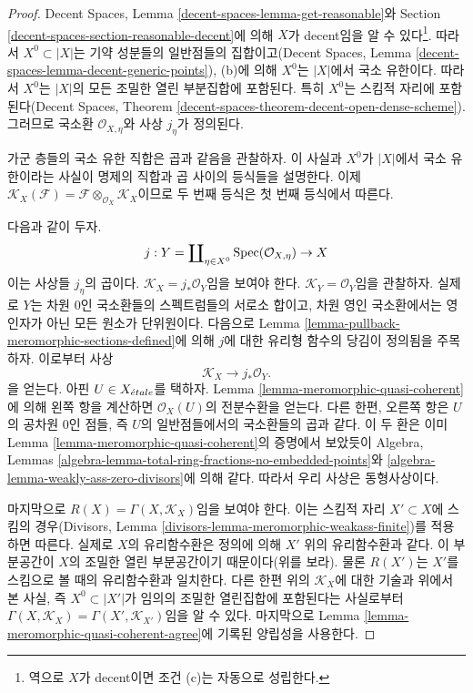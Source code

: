 \begin{proof}
Decent Spaces, Lemma \ref{decent-spaces-lemma-get-reasonable}와 Section
\ref{decent-spaces-section-reasonable-decent}에 의해 $X$가 decent임을 알 수
있다\footnote{역으로 $X$가 decent이면 조건 (c)는 자동으로 성립한다.}.
따라서 $X^0 \subset |X|$는 기약 성분들의 일반점들의 집합이고(Decent
Spaces, Lemma \ref{decent-spaces-lemma-decent-generic-points}), (b)에 의해
$X^0$는 $|X|$에서 국소 유한이다. 따라서 $X^0$는 $|X|$의 모든 조밀한 열린
부분집합에 포함된다. 특히 $X^0$는 스킴적 자리에 포함된다(Decent Spaces,
Theorem \ref{decent-spaces-theorem-decent-open-dense-scheme}). 그러므로
국소환 $\mathcal{O}_{X, \eta}$와 사상 $j_\eta$가 정의된다.

\medskip\noindent
가군 층들의 국소 유한 직합은 곱과 같음을 관찰하자. 이 사실과 $X^0$가
$|X|$에서 국소 유한이라는 사실이 명제의 직합과 곱 사이의 등식들을
설명한다. 이제
$\mathcal{K}_X(\mathcal{F}) =
\mathcal{F} \otimes_{\mathcal{O}_X} \mathcal{K}_X$이므로 두 번째 등식은
첫 번째 등식에서 따른다.

\medskip\noindent
다음과 같이 두자.
$$
j : Y = \coprod\nolimits_{\eta \in X^0} \mathop{\mathrm{Spec}}(\mathcal{O}_{X, \eta}) \to X
$$
이는 사상들 $j_\eta$의 곱이다. $\mathcal{K}_X = j_*\mathcal{O}_Y$임을
보여야 한다. $\mathcal{K}_Y = \mathcal{O}_Y$임을 관찰하자. 실제로 $Y$는
차원 $0$인 국소환들의 스펙트럼들의 서로소 합이고, 차원 영인 국소환에서는
영인자가 아닌 모든 원소가 단위원이다. 다음으로 Lemma
\ref{lemma-pullback-meromorphic-sections-defined}에 의해 $j$에 대한 유리형
함수의 당김이 정의됨을 주목하자. 이로부터 사상
$$
\mathcal{K}_X \longrightarrow j_*\mathcal{O}_Y.
$$
을 얻는다. 아핀 $U \in X_{\acute{e}tale}$를 택하자. Lemma
\ref{lemma-meromorphic-quasi-coherent}에 의해
왼쪽 항을 계산하면 $\mathcal{O}_X(U)$의 전분수환을 얻는다. 다른 한편,
오른쪽 항은 $U$의 공차원 $0$인 점들, 즉 $U$의 일반점들에서의 국소환들의
곱과 같다. 이 두 환은 이미 Lemma
\ref{lemma-meromorphic-quasi-coherent}의 증명에서 보았듯이 Algebra, Lemmas
\ref{algebra-lemma-total-ring-fractions-no-embedded-points}와
\ref{algebra-lemma-weakly-ass-zero-divisors}에 의해 같다.
따라서 우리 사상은 동형사상이다.

\medskip\noindent
마지막으로 $R(X) = \Gamma(X, \mathcal{K}_X)$임을 보여야 한다. 이는 스킴적
자리 $X' \subset X$에 스킴의 경우(Divisors, Lemma
\ref{divisors-lemma-meromorphic-weakass-finite})를 적용하면 따른다.
실제로 $X$의 유리함수환은 정의에 의해 $X'$ 위의 유리함수환과 같다.
이 부분공간이 $X$의 조밀한 열린 부분공간이기 때문이다(위를 보라). 물론
$R(X')$는 $X'$를 스킴으로 볼 때의 유리함수환과 일치한다. 다른 한편 위의
$\mathcal{K}_X$에 대한 기술과 위에서 본 사실, 즉 $X^0 \subset |X'|$가
임의의 조밀한 열린집합에 포함된다는 사실로부터
$\Gamma(X, \mathcal{K}_X) = \Gamma(X', \mathcal{K}_{X'})$임을 알 수 있다.
마지막으로 Lemma \ref{lemma-meromorphic-quasi-coherent-agree}에 기록된
양립성을 사용한다.
\end{proof}

